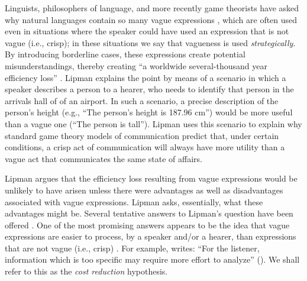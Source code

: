 \documentclass[ %
  graybox       %
 ,envcountchap  %
 ,sectrefs      %
]{svmono}
\begin{document}
Linguists, philosophers of language, and more recently game theorists have asked why natural languages contain so many vague expressions \citet{Lipman:2000fk, lipmanvague}, which are
often used even in situations where the speaker could have used an expression that is not vague (i.e., crisp); in these situations we say that vagueness is used \emph{strategically}.
By introducing borderline cases, these expressions create potential misunderstandings, thereby creating ``a worldwide several-thousand year efficiency loss'' \citet[][p.~1]{lipmanvague}.
Lipman explains the point by means of a scenario in which a speaker describes a person to a hearer, who needs to identify that person in the arrivals hall of of an airport.
In such a scenario, a precise description of the person's height (e.g., ``The person's height is 187.96 cm'') would be more useful than a vague one (``The person is tall'').
Lipman uses this scenario to explain why standard game theory models of communication \citep[e.g.,][]{Crawford:1982lr} predict that, under certain conditions, a crisp act of communication will always have more utility than a vague act that communicates the same state of affairs.

Lipman argues that the efficiency loss resulting from vague expressions would be unlikely to have arisen unless there were advantages as well as disadvantages associated with vague expressions.
Lipman asks, essentially, what these advantages might be.
Several tentative answers to Lipman's question have been offered \citep[see][]{van2009utility, vanDeemterBook}.
One of the most promising answers appears to be the idea that vague expressions are easier to process, by a speaker and/or a hearer, than expressions that are not vague (i.e., crisp) \citep[e.g.,][]{lipmanvague,De-Jaegher:2003lr,vanrooij2003lr}.
For example, \citeauthor{lipmanvague} writes: ``For the listener, information which is too specific may require more effort to analyze'' (\citeyear[][p.~11]{lipmanvague}).
We shall refer to this as the \emph{cost reduction} hypothesis.
\end{document}
